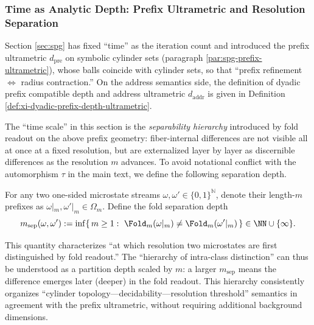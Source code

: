 \subsubsection{Time as Analytic Depth: Prefix Ultrametric and Resolution Separation}\label{subsubsec:frt-time-as-depth}
Section \ref{sec:spg} has fixed ``time'' as the iteration count and introduced the prefix ultrametric \(d_{\mathrm{pre}}\) on symbolic cylinder sets (paragraph \ref{par:spg-prefix-ultrametric}), whose balls coincide with cylinder sets, so that ``prefix refinement \(\Leftrightarrow\) radius contraction.'' On the address semantics side, the definition of dyadic prefix compatible depth and address ultrametric \(d_{\mathrm{addr}}\) is given in Definition \ref{def:xi-dyadic-prefix-depth-ultrametric}.\par
The ``time scale'' in this section is the \emph{separability hierarchy} introduced by fold readout on the above prefix geometry: fiber-internal differences are not visible all at once at a fixed resolution, but are externalized layer by layer as discernible differences as the resolution \(m\) advances. To avoid notational conflict with the automorphism \(\tau\) in the main text, we define the following separation depth.
\begin{definition}\label{def:frt-fold-separation-depth}
For any two one-sided microstate streams \(\omega,\omega'\in\{0,1\}^{\mathbb{N}}\), denote their length-\(m\) prefixes as \(\omega|_m,\omega'|_m\in\Omega_m\). Define the fold separation depth
\[
m_{\mathrm{sep}}(\omega,\omega')
:=\inf\{\,m\ge 1:\ \Fold_m(\omega|_m)\ne \Fold_m(\omega'|_m)\,\}\in\NN\cup\{\infty\}.
\]
\end{definition}
This quantity characterizes ``at which resolution two microstates are first distinguished by fold readout.'' The ``hierarchy of intra-class distinction'' can thus be understood as a partition depth scaled by \(m\): a larger \(m_{\mathrm{sep}}\) means the difference emerges later (deeper) in the fold readout. This hierarchy consistently organizes ``cylinder topology---decidability---resolution threshold'' semantics in agreement with the prefix ultrametric, without requiring additional background dimensions.

